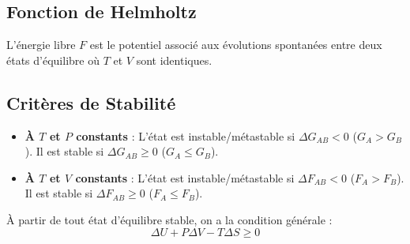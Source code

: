 \documentclass[french]{yLectureNote}
\begin{document}
\subsection{Fonction de Helmholtz}


\begin{proposition}
L'énergie libre $F$ est le potentiel associé aux évolutions spontanées entre deux états d'équilibre où $T$ et $V$ sont identiques.
\end{proposition}


\subsection{Critères de Stabilité}
\begin{itemize}
    \item \textbf{À $T$ et $P$ constants} : L'état est instable/métastable si $\Delta G_{AB} < 0$ ($G_A > G_B$). Il est stable si $\Delta G_{AB} \ge 0$ ($G_A \le G_B$).
    \item \textbf{À $T$ et $V$ constants} : L'état est instable/métastable si $\Delta F_{AB} < 0$ ($F_A > F_B$). Il est stable si $\Delta F_{AB} \ge 0$ ($F_A \le F_B$).
\end{itemize}

\begin{theorem}
À partir de tout état d'équilibre stable, on a la condition générale :
$$\Delta U + P\Delta V - T\Delta S \ge 0$$
\end{theorem}
\end{document}
